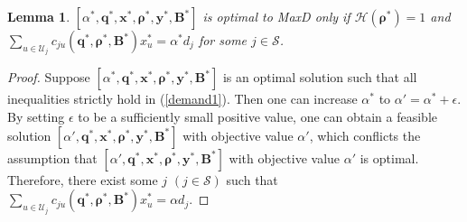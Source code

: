 \documentclass[10pt,journal,final,finalsubmission,twocolumn]{IEEEtran}
\newtheorem{lemma}[theorem]{Lemma}
\begin{document}
\begin{lemma}\label{property 1}
$[\alpha ^*, \boldsymbol{q}^*,\boldsymbol{x}^*,\boldsymbol{\rho}^*, \boldsymbol{y}^*, \boldsymbol{B}^*]$ is optimal to MaxD only if $\mathcal{H}(\boldsymbol{\rho^*}) = 1$ and $\sum_{u\in \mathcal{U}_j} c_{ju}\left (\boldsymbol{q}^*,\boldsymbol{ \rho}^*, \boldsymbol{B}^*\right )x_u^*= \alpha^* d_j$ for some $j\in \mathcal{S}$.
\end{lemma}
\begin{proof} 
Suppose $[\alpha ^*, \boldsymbol{q}^*,\boldsymbol{x}^*,\boldsymbol{\rho}^*, \boldsymbol{y}^*,\boldsymbol{B}^*]$ is an optimal solution such that all inequalities strictly hold in (\ref{demand1}). Then one can increase $\alpha^*$ to $\alpha' = \alpha^* + \epsilon$. By setting $\epsilon$ to be a sufficiently small positive value, one can obtain a feasible solution $[\alpha', \boldsymbol{q}^*,\boldsymbol{x}^*,\boldsymbol{\rho}^*, \boldsymbol{y}^*,\boldsymbol{B}^*]$ with objective value $\alpha '$, which conflicts the assumption that $[\alpha', \boldsymbol{q}^*,\boldsymbol{x}^*,\boldsymbol{\rho}^*, \boldsymbol{y}^*,\boldsymbol{B}^*]$ with objective value $\alpha '$ is optimal. Therefore, there exist some $j$ $(j\in \mathcal{S})$ such that $\sum_{u\in \mathcal{U}_j} c_{ju}\left (\boldsymbol{q}^*,\boldsymbol{ \rho}^*, \boldsymbol{B}^*\right )x_u^*= \alpha d_j$.


\end{proof}
\end{document}
